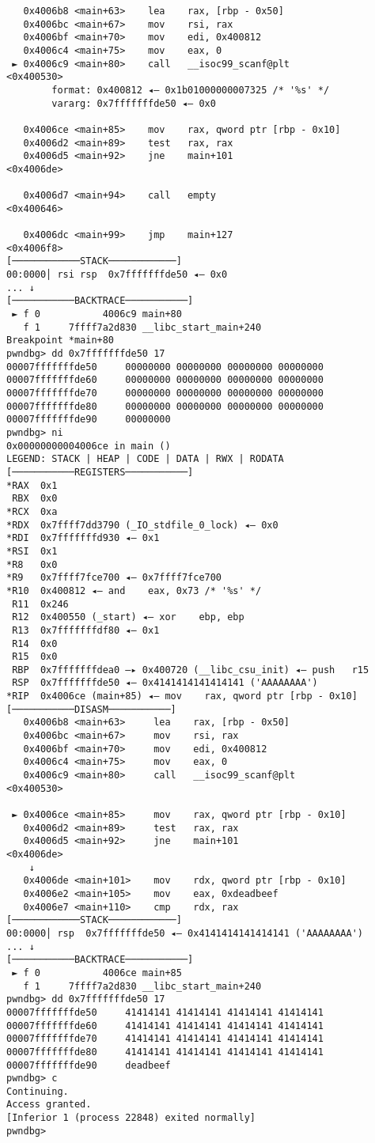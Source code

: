 \begin{lstlisting}
   0x4006b8 <main+63>    lea    rax, [rbp - 0x50]
   0x4006bc <main+67>    mov    rsi, rax
   0x4006bf <main+70>    mov    edi, 0x400812
   0x4006c4 <main+75>    mov    eax, 0
 ► 0x4006c9 <main+80>    call   __isoc99_scanf@plt            <0x400530>
        format: 0x400812 ◂— 0x1b01000000007325 /* '%s' */
        vararg: 0x7fffffffde50 ◂— 0x0
 
   0x4006ce <main+85>    mov    rax, qword ptr [rbp - 0x10]
   0x4006d2 <main+89>    test   rax, rax
   0x4006d5 <main+92>    jne    main+101                      <0x4006de>
 
   0x4006d7 <main+94>    call   empty                         <0x400646>
 
   0x4006dc <main+99>    jmp    main+127                      <0x4006f8>
[────────────STACK────────────]
00:0000│ rsi rsp  0x7fffffffde50 ◂— 0x0
... ↓
[───────────BACKTRACE───────────]
 ► f 0           4006c9 main+80
   f 1     7ffff7a2d830 __libc_start_main+240
Breakpoint *main+80
pwndbg> dd 0x7fffffffde50 17
00007fffffffde50     00000000 00000000 00000000 00000000
00007fffffffde60     00000000 00000000 00000000 00000000
00007fffffffde70     00000000 00000000 00000000 00000000
00007fffffffde80     00000000 00000000 00000000 00000000
00007fffffffde90     00000000
pwndbg> ni
0x00000000004006ce in main ()
LEGEND: STACK | HEAP | CODE | DATA | RWX | RODATA
[───────────REGISTERS───────────]
*RAX  0x1
 RBX  0x0
*RCX  0xa
*RDX  0x7ffff7dd3790 (_IO_stdfile_0_lock) ◂— 0x0
*RDI  0x7fffffffd930 ◂— 0x1
*RSI  0x1
*R8   0x0
*R9   0x7ffff7fce700 ◂— 0x7ffff7fce700
*R10  0x400812 ◂— and    eax, 0x73 /* '%s' */
 R11  0x246
 R12  0x400550 (_start) ◂— xor    ebp, ebp
 R13  0x7fffffffdf80 ◂— 0x1
 R14  0x0
 R15  0x0
 RBP  0x7fffffffdea0 —▸ 0x400720 (__libc_csu_init) ◂— push   r15
 RSP  0x7fffffffde50 ◂— 0x4141414141414141 ('AAAAAAAA')
*RIP  0x4006ce (main+85) ◂— mov    rax, qword ptr [rbp - 0x10]
[───────────DISASM───────────]
   0x4006b8 <main+63>     lea    rax, [rbp - 0x50]
   0x4006bc <main+67>     mov    rsi, rax
   0x4006bf <main+70>     mov    edi, 0x400812
   0x4006c4 <main+75>     mov    eax, 0
   0x4006c9 <main+80>     call   __isoc99_scanf@plt            <0x400530>
 
 ► 0x4006ce <main+85>     mov    rax, qword ptr [rbp - 0x10]
   0x4006d2 <main+89>     test   rax, rax
   0x4006d5 <main+92>     jne    main+101                      <0x4006de>
    ↓
   0x4006de <main+101>    mov    rdx, qword ptr [rbp - 0x10]
   0x4006e2 <main+105>    mov    eax, 0xdeadbeef
   0x4006e7 <main+110>    cmp    rdx, rax
[────────────STACK────────────]
00:0000│ rsp  0x7fffffffde50 ◂— 0x4141414141414141 ('AAAAAAAA')
... ↓
[───────────BACKTRACE───────────]
 ► f 0           4006ce main+85
   f 1     7ffff7a2d830 __libc_start_main+240
pwndbg> dd 0x7fffffffde50 17
00007fffffffde50     41414141 41414141 41414141 41414141
00007fffffffde60     41414141 41414141 41414141 41414141
00007fffffffde70     41414141 41414141 41414141 41414141
00007fffffffde80     41414141 41414141 41414141 41414141
00007fffffffde90     deadbeef
pwndbg> c
Continuing.
Access granted.
[Inferior 1 (process 22848) exited normally]
pwndbg> 
\end{lstlisting}

